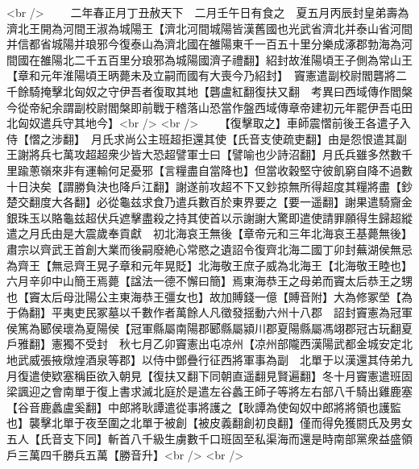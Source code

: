 <br />
　　二年春正月丁丑赦天下　二月壬午日有食之　夏五月丙辰封皇弟壽為濟北王開為河間王淑為城陽王【濟北河間城陽皆漢舊國也光武省濟北并泰山省河間并信都省城陽并琅邪今復泰山為濟北國在雒陽東千一百五十里分樂成涿郡勃海為河間國在雒陽北二千五百里分琅邪為城陽國濟子禮翻】紹封故淮陽頃王子側為常山王【章和元年淮陽頃王昞薨未及立嗣而國有大喪今乃紹封】　竇憲遣副校尉閻礱將二千餘騎掩擊北匈奴之守伊吾者復取其地【礱盧紅翻復扶又翻　考異曰西域傳作閻槃今從帝紀余謂副校尉閻槃即前戰于稽落山恐當作盤西域傳章帝建初元年罷伊吾屯田北匈奴遣兵守其地今】<br />
<br />
　　【復擊取之】車師震慴前後王各遣子入侍【慴之涉翻】　月氏求尚公主班超拒還其使【氏音支使疏吏翻】由是怨恨遣其副王謝將兵七萬攻超超衆少皆大恐超譬軍士曰【譬喻也少詩沼翻】月氏兵雖多然數千里踰蔥嶺來非有運輸何足憂邪【言糧盡自當降也】但當收穀堅守彼飢窮自降不過數十日決矣【謂勝負決也降戶江翻】謝遂前攻超不下又鈔掠無所得超度其糧將盡【鈔楚交翻度大各翻】必從龜兹求食乃遣兵數百於東界要之【要一遥翻】謝果遣騎齎金銀珠玉以賂龜兹超伏兵遮擊盡殺之持其使首以示謝謝大驚即遣使請罪願得生歸超縱遣之月氏由是大震歲奉貢獻　初北海哀王無後【章帝元和三年北海哀王基薨無後】肅宗以齊武王首創大業而後嗣廢絶心常愍之遺詔令復齊北海二國丁卯封蕪湖侯無忌為齊王【無忌齊王晃子章和元年晃貶】北海敬王庶子威為北海王【北海敬王睦也】　六月辛卯中山簡王焉薨【諡法一德不懈曰簡】焉東海恭王之母弟而竇太后恭王之甥也【竇太后母沘陽公主東海恭王彊女也】故加賻錢一億【賻音附】大為修冢塋【為于偽翻】平夷吏民冢墓以千數作者萬餘人凡徵發揺動六州十八郡　詔封竇憲為冠軍侯篤為郾侯瓌為夏陽侯【冠軍縣屬南陽郡郾縣屬潁川郡夏陽縣屬馮翊郡冠古玩翻夏戶雅翻】憲獨不受封　秋七月乙卯竇憲出屯凉州【凉州部隴西漢陽武都金城安定北地武威張掖燉煌酒泉等郡】以侍中鄧疊行征西將軍事為副　北單于以漢還其侍弟九月復遣使欵塞稱臣欲入朝見【復扶又翻下同朝直遥翻見賢遍翻】冬十月竇憲遣班固梁諷迎之會南單于復上書求滅北庭於是遣左谷蠡王師子等將左右部八千騎出雞鹿塞【谷音鹿蠡盧奚翻】中郎將耿譚遣從事將護之【耿譚為使匈奴中郎將將領也護監也】襲擊北單于夜至圍之北單于被創【被皮義翻創初良翻】僅而得免獲閼氏及男女五人【氏音支下同】斬首八千級生虜數千口班固至私渠海而還是時南部黨衆益盛領戶三萬四千勝兵五萬【勝音升】<br />
<br />
